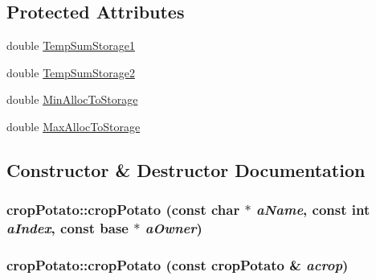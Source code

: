 \subsection*{Protected Attributes}
\begin{DoxyCompactItemize}
\item 
double \hyperlink{classcrop_potato_a986fb7be4c5a97f0b5e4199cda9cd6c9}{TempSumStorage1}
\item 
double \hyperlink{classcrop_potato_a4844a762de8ce4e50e54aba8fc112202}{TempSumStorage2}
\item 
double \hyperlink{classcrop_potato_a0247e61ee73a613c0bd9a9aec1765d46}{MinAllocToStorage}
\item 
double \hyperlink{classcrop_potato_a45ec67fb693cd9b52fd972cb78dabf9c}{MaxAllocToStorage}
\end{DoxyCompactItemize}


\subsection{Constructor \& Destructor Documentation}
\hypertarget{classcrop_potato_a7bca57ea9a8637251d82034d91a2ead0}{
\subsubsection[{cropPotato}]{\setlength{\rightskip}{0pt plus 5cm}cropPotato::cropPotato (const char $\ast$ {\em aName}, \/  const int {\em aIndex}, \/  const {\bf base} $\ast$ {\em aOwner})}}
\label{classcrop_potato_a7bca57ea9a8637251d82034d91a2ead0}
\hypertarget{classcrop_potato_a721e52113fa0b383487d8490f64cb127}{
\subsubsection[{cropPotato}]{\setlength{\rightskip}{0pt plus 5cm}cropPotato::cropPotato (const {\bf cropPotato} \& {\em acrop})}}
\label{classcrop_potato_a721e52113fa0b383487d8490f64cb127}


